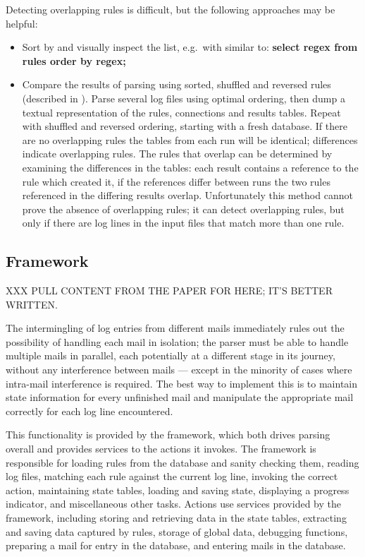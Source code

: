 Detecting overlapping rules is difficult, but the following approaches may
be helpful:

\begin{itemize}

    \item Sort by \regex{} and visually inspect the list, e.g.\ with \SQL{}
        similar to: \textbf{select regex from rules order by regex;}

    \item Compare the results of parsing using sorted, shuffled and
        reversed rules (described in ).  Parse several log files using optimal ordering, then
        dump a textual representation of the rules, connections and results
        tables.  Repeat with shuffled and reversed ordering, starting with
        a fresh database.  If there are no overlapping rules the tables
        from each run will be identical; differences indicate overlapping
        rules.  The rules that overlap can be determined by examining the
        differences in the tables: each result contains a reference to the
        rule which created it, if the references differ between runs the
        two rules referenced in the differing results overlap.
        Unfortunately this method cannot prove the absence of overlapping
        rules; it can detect overlapping rules, but only if there are log
        lines in the input files that match more than one rule.

\end{itemize}


\subsection{Framework}

XXX PULL CONTENT FROM THE PAPER FOR HERE\@; IT'S BETTER WRITTEN\@.

\label{framework}

The intermingling of log entries from different mails immediately rules out
the possibility of handling each mail in isolation; the parser must be able
to handle multiple mails in parallel, each potentially at a different stage
in its journey, without any interference between mails --- except in the
minority of cases where intra-mail interference is required.  The best way
to implement this is to maintain state information for every unfinished
mail and manipulate the appropriate mail correctly for each log line
encountered.

This functionality is provided by the framework, which both drives parsing
overall and provides services to the actions it invokes.  The framework is
responsible for loading rules from the database and sanity checking them,
reading log files, matching each rule against the current log line,
invoking the correct action, maintaining state tables, loading and saving
state, displaying a progress indicator, and miscellaneous other tasks.
Actions use services provided by the framework, including storing and
retrieving data in the state tables, extracting and saving data captured by
rules, storage of global data, debugging functions, preparing a mail for
entry in the database, and entering mails in the database.

